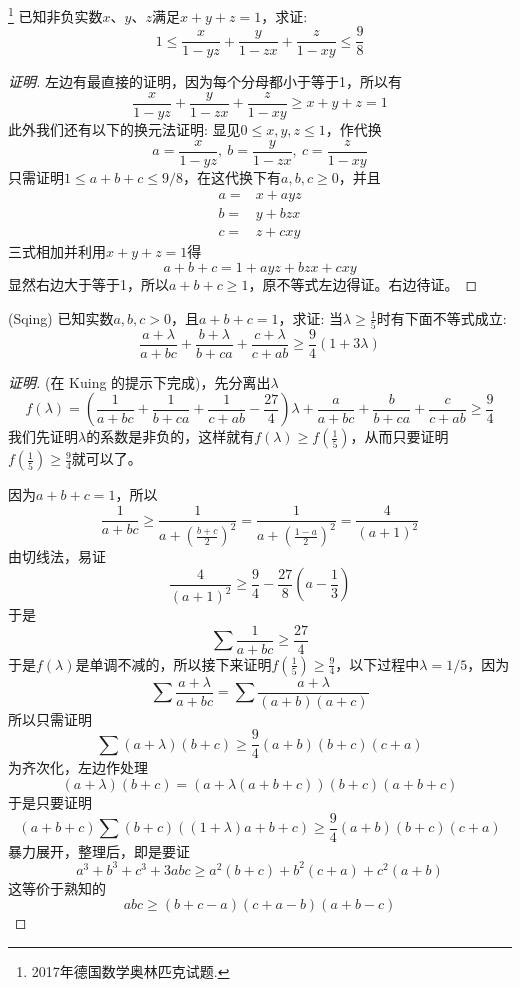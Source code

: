 \begin{exercise}\footnote{2017年德国数学奥林匹克试题.}
  已知非负实数$x$、$y$、$z$满足$x+y+z=1$，求证:
  \[ 1 \leqslant \frac{x}{1-yz}+\frac{y}{1-zx}+\frac{z}{1-xy} \leqslant \frac{9}{8} \]
\end{exercise}

\begin{proof}[证明]
  左边有最直接的证明，因为每个分母都小于等于1，所以有
  \[ \frac{x}{1-yz}+\frac{y}{1-zx}+\frac{z}{1-xy} \geqslant x+y+z = 1 \]
  此外我们还有以下的换元法证明:
  显见$0 \leqslant x,y,z \leqslant 1$，作代换
  \[ a=\frac{x}{1-yz}, \  b=\frac{y}{1-zx}, \  c=\frac{z}{1-xy} \]
  只需证明$1\leqslant a+b+c \leqslant 9/8$，在这代换下有$a,b,c \geqslant 0$，并且
  \begin{align*}
    a = {} & x+ayz \\
    b = {} & y+bzx \\
    c = {} & z+cxy
  \end{align*}
  三式相加并利用$x+y+z=1$得
  \[ a+b+c=1+ayz+bzx+cxy \]
  显然右边大于等于1，所以$a+b+c\geqslant 1$，原不等式左边得证。右边待证。
\end{proof}

\begin{exercise}
  (Sqing) 已知实数$a,b,c>0$，且$a+b+c=1$，求证: 当$\lambda \geqslant \frac{1}{5}$时有下面不等式成立:
  \[ \frac{a+\lambda}{a+bc} + \frac{b+\lambda}{b+ca} + \frac{c+\lambda}{c+ab} \geqslant \frac{9}{4}(1+3\lambda) \]
  \begin{proof}[证明]
    (在 Kuing 的提示下完成)，先分离出$\lambda$
    \[ f(\lambda) = \left( \frac{1}{a+bc}+\frac{1}{b+ca}+\frac{1}{c+ab}-\frac{27}{4} \right) \lambda + \frac{a}{a+bc}+\frac{b}{b+ca}+\frac{c}{c+ab} \geqslant \frac{9}{4} \]
    我们先证明$\lambda$的系数是非负的，这样就有$f(\lambda)\geqslant f\left( \frac{1}{5} \right)$，从而只要证明$f\left( \frac{1}{5} \right) \geqslant \frac{9}{4}$就可以了。

    因为$a+b+c=1$，所以
    \[ \frac{1}{a+bc} \geqslant \frac{1}{a+\left( \frac{b+c}{2} \right)^2} =
    \frac{1}{a+\left( \frac{1-a}{2} \right)^2} = \frac{4}{(a+1)^2} \]
  由切线法，易证
  \[ \frac{4}{(a+1)^2} \geqslant \frac{9}{4}-\frac{27}{8}\left( a-\frac{1}{3} \right) \]
  于是
  \[ \sum \frac{1}{a+bc} \geqslant \frac{27}{4} \]
  于是$f(\lambda)$是单调不减的，所以接下来证明$f\left( \frac{1}{5} \right) \geqslant \frac{9}{4}$，以下过程中$\lambda=1/5$，因为
  \[ \sum \frac{a+\lambda}{a+bc} = \sum \frac{a+\lambda}{(a+b)(a+c)} \]
  所以只需证明
  \[ \sum (a+\lambda)(b+c) \geqslant \frac{9}{4}(a+b)(b+c)(c+a) \]
  为齐次化，左边作处理
  \[ (a+\lambda)(b+c) = (a+\lambda(a+b+c))(b+c)(a+b+c) \]
  于是只要证明
  \[ (a+b+c)\sum (b+c)((1+\lambda)a+b+c) \geqslant \frac{9}{4}(a+b)(b+c)(c+a) \]
  暴力展开，整理后，即是要证
  \[ a^3+b^3+c^3 +3abc \geqslant a^2(b+c) + b^2(c+a)+c^2(a+b) \]
  这等价于熟知的
  \[ abc \geqslant (b+c-a)(c+a-b)(a+b-c) \]
  \end{proof}
\end{exercise}

